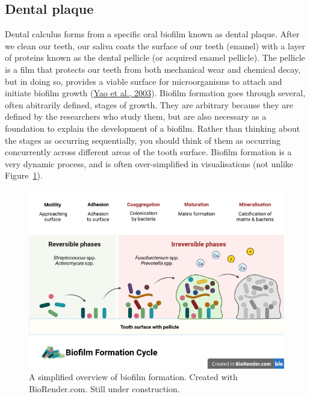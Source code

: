 \documentclass[
  letterpaper,
]{book}
\begin{document}
\hypertarget{dental-plaque}{%
\subsection{Dental plaque}\label{dental-plaque}}

Dental calculus forms from a specific oral biofilm known as dental
plaque. After we clean our teeth, our saliva coats the surface of our
teeth (enamel) with a layer of proteins known as the dental pellicle (or
acquired enamel pellicle). The pellicle is a film that protects our
teeth from both mechanical wear and chemical decay, but in doing so,
provides a viable surface for microorganisms to attach and initiate
biofilm growth (\protect\hyperlink{ref-yaoIdentificationProtein2003}{Yao
et al., 2003}). Biofilm formation goes through several, often abitrarily
defined, stages of growth. They are arbitrary because they are defined
by the researchers who study them, but are also necessary as a
foundation to explain the development of a biofilm. Rather than thinking
about the stages as occurring sequentially, you should think of them as
occurring concurrently across different areas of the tooth surface.
Biofilm formation is a very dynamic process, and is often
over-simplified in visualisations (not unlike
Figure~\ref{fig-biofilm-form}).

\begin{figure}

{\centering \includegraphics{./figures/biofilm_formation.png}

}

\caption{\label{fig-biofilm-form}A simplified overview of biofilm
formation. Created with BioRender.com. Still under construction.}

\end{figure}
\end{document}
